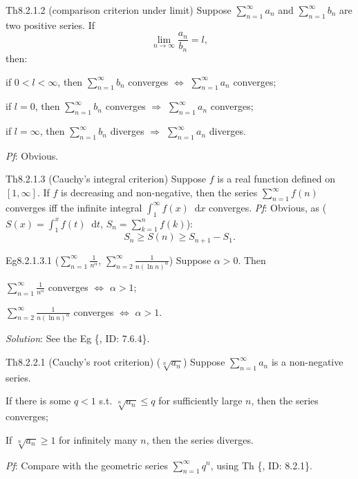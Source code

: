 \documentclass{article}
\newcommand{\dif}{\mathop{}\!\mathrm{d}}
\begin{document}
\begin{Th}{Th8.2.1.2 (comparison criterion under limit)}
    Suppose $\sum_{n=1}^{\infty} a_n$ and $\sum_{n=1}^{\infty} b_n$ are two positive series. If
    $$ \lim_{n\to\infty} \frac{a_n}{b_n} = l, $$
    then:
    \begin{compactitem}
        \item if $0 < l < \infty$, then $\sum_{n=1}^{\infty} b_n$ converges $\Leftrightarrow$ $\sum_{n=1}^{\infty} a_n$ converges;
        \item if $l = 0$, then $\sum_{n=1}^{\infty} b_n$ converges $\Rightarrow$ $\sum_{n=1}^{\infty} a_n$ converges;
        \item if $l = \infty$, then $\sum_{n=1}^{\infty} b_n$ diverges $\Rightarrow$ $\sum_{n=1}^{\infty} a_n$ diverges.
    \end{compactitem}
    \tcblower
    \textit{Pf}: Obvious.
\end{Th}

\begin{Th}{Th8.2.1.3 (Cauchy's integral criterion)}
    Suppose $f$ is a real function defined on $[1, \infty]$. If $f$ is decreasing and non-negative, then the series $\sum_{n=1}^{\infty} f(n)$ converges iff the infinite integral $\int_{1}^{\infty} f(x)\dif x$ converges.
    \tcblower
    \tcblower
    \textit{Pf}: Obvious, as ($S(x) = \int_{1}^{x} f(t)\dif t$, $S_n = \sum_{k=1}^{n} f(k)$):
    $$ S_n \geq S(n) \geq S_{n+1}-S_1. $$
\end{Th}

\begin{Th}{Eg8.2.1.3.1 ($\sum_{n=1}^{\infty} \frac{1}{n^\alpha}$, $\sum_{n=2}^{\infty} \frac{1}{n(\ln n)^\alpha}$)}
    Suppose $\alpha>0$. Then
    \begin{compactenum}
        \item $\sum_{n=1}^{\infty} \frac{1}{n^\alpha}$ converges $\Leftrightarrow$ $\alpha>1$;
        \item $\sum_{n=2}^{\infty} \frac{1}{n(\ln n)^\alpha}$ converges $\Leftrightarrow$ $\alpha>1$.
    \end{compactenum}
    \tcblower
    \textit{Solution}: See the Eg \{, ID: 7.6.4\}.
\end{Th}

\begin{Th}{Th8.2.2.1 (Cauchy's root criterion) ($\sqrt[n]{a_n}$)}
    Suppose $\sum_{n=1}^{\infty} a_n$ is a non-negative series. 
    \begin{compactenum}
        \item If there is some $q<1$ s.t. $\sqrt[n]{a_n} \leq q$ for sufficiently large $n$, then the series converges;
        \item If $\sqrt[n]{a_n} \geq 1$ for infinitely many $n$, then the series diverges.
    \end{compactenum}
    \tcblower
    \textit{Pf}: Compare with the geometric series $\sum_{n=1}^{\infty} q^{n}$, using Th \{, ID: 8.2.1\}.
\end{Th}
\end{document}
